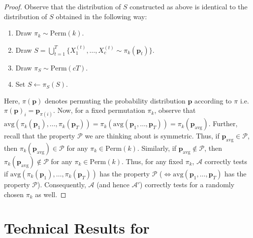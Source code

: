 \documentclass[10pt]{article} %
\theoremstyle{plain}
\newcommand{\bp}{\textbf{p}}
\newcommand{\avg}{\mathrm{avg}}
\begin{document}
\begin{proof}
	Observe that the distribution of $S$ constructed as above is identical to the distribution of $S$ obtained in the following way:
	\begin{enumerate}
		\item Draw $\pi_k \sim \textrm{Perm}(k)$.
		\item Draw $S = \bigcup_{t=1}^T\{X^{(t)}_1,\dots, X^{(t)}_c \sim \pi_k(\bp_t)\}$.
		\item Draw $\pi_S \sim \textrm{Perm}(cT)$.
		\item Set $S \gets \pi_S(S)$.
	\end{enumerate}
	Here, $\pi(\bp)$ denotes permuting the probability distribution $\bp$ according to $\pi$ i.e. $\pi(\bp)_i = \bp_{\pi(i)}$. Now, for a fixed permutation $\pi_k$, observe that $\avg(\pi_k(\bp_1),\dots,\pi_k(\bp_T)) = \pi_k(\avg(\bp_1,\dots,\bp_T))=\pi_k(\bp_{\avg})$. Further, recall that the property $\mathcal{P}$ we are thinking about is symmetric. Thus, if $\bp_{\avg} \in \mathcal{P}$, then $\pi_k(\bp_{\avg}) \in \mathcal{P}$ for any $\pi_k \in \textrm{Perm}(k)$. Similarly, if $\bp_{\avg} \notin \mathcal{P}$, then $\pi_k(\bp_{\avg}) \notin \mathcal{P}$ for any $\pi_k \in \textrm{Perm}(k)$. Thus, for any fixed $\pi_k$, $\mathcal{A}$ correctly tests if $\avg(\pi_k(\bp_1),\dots,\pi_k(\bp_T))$ has the property $\mathcal{P}$ ($\iff \avg(\bp_1,\dots,\bp_T)$ has the property $\mathcal{P}$). Consequently, $\mathcal{A}$ (and hence $\mathcal{A}'$) correctly tests for a randomly chosen $\pi_k$ as well.
	
	
\end{proof}



\section{Technical Results for }
\label{sec:helper_lemmas_clt}
\end{document}
